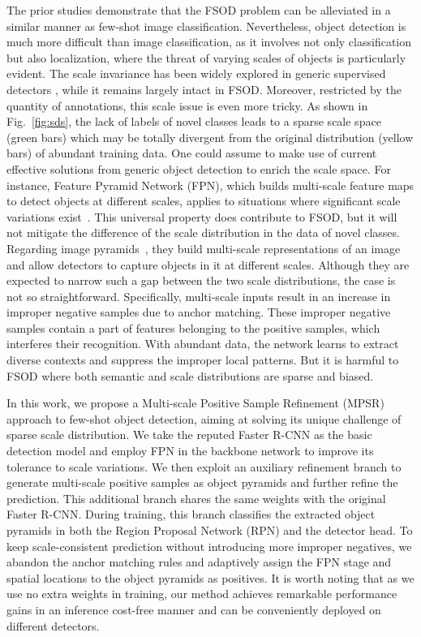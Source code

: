 \documentclass[runningheads]{llncs}
\begin{document}
The prior studies demonstrate that the FSOD problem can be alleviated in a similar manner as few-shot image classification. 
Nevertheless, object detection is much more difficult than image classification, as it involves not only classification but also localization, where the threat of varying scales of objects is particularly evident.
The scale invariance has been widely explored in generic supervised detectors \cite{fastrcnn,snip,sniper,san}, while it remains largely intact in FSOD.
Moreover, restricted by the quantity of annotations, this scale issue is even more tricky.
As shown in Fig.~\ref{fig:sds}, the lack of labels of novel classes leads to a sparse scale space (green bars) which may be totally divergent from the original distribution (yellow bars) of abundant training data. 
One could assume to make use of current effective solutions from generic object detection to enrich the scale space.
For instance, Feature Pyramid Network (FPN), which builds multi-scale feature maps to detect objects at different scales, applies to situations where significant scale variations exist~\cite{fpn}.
This universal property does contribute to FSOD, but it will not mitigate the difference of the scale distribution in the data of novel classes.
Regarding image pyramids~\cite{sppnet,fastrcnn}, they build multi-scale representations of an image and allow detectors to capture objects in it at different scales.
Although they are expected to narrow such a gap between the two scale distributions, the case is not so straightforward.
Specifically, multi-scale inputs result in an increase in improper negative samples due to anchor matching.
These improper negative samples contain a part of features belonging to the positive samples, which interferes their recognition. 
With abundant data, the network learns to extract diverse contexts and suppress the improper local patterns. 
But it is harmful to FSOD where both semantic and scale distributions are sparse and biased.

In this work, we propose a Multi-scale Positive Sample Refinement (MPSR) approach to few-shot object detection, aiming at solving its unique challenge of sparse scale distribution.
We take the reputed Faster R-CNN as the basic detection model and employ FPN in the backbone network to improve its tolerance to scale variations. 
We then exploit an auxiliary refinement branch to generate multi-scale positive samples as object pyramids and further refine the prediction. 
This additional branch shares the same weights with the original Faster R-CNN.
During training, this branch classifies the extracted object pyramids in both the Region Proposal Network (RPN) and the detector head.
To keep scale-consistent prediction without introducing more improper negatives, we abandon the anchor matching rules and adaptively assign the FPN stage and spatial locations to the object pyramids as positives. It is worth noting that as we use no extra weights in training, our method achieves remarkable performance gains in an inference cost-free manner and can be conveniently deployed on different detectors.
\end{document}
